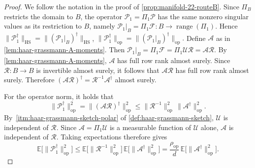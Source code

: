\documentclass[final,onefignum,onetabnum]{siamart250211}
\begin{document}
\begin{proof}
  We follow the notation in the proof of \cref{prop:manifold-22-routeB}.
  Since $\Pi_B$ restricts the domain to $B$, the operator $\mathcal P_1=\Pi_1\mathcal P$ has the same nonzero singular values as its restriction to $B$, namely
  $
  \mathcal P_1\vert_B=\Pi_1\mathcal F:B\to \operatorname{range}(\Pi_1).
  $
  Hence
  $
  \|\mathcal P_1^{\dagger}\|_{\mathrm{HS}}
  =
  \|(\mathcal P_1\vert_B)^{\dagger}\|_{\mathrm{HS}}
  $, $
  \|\mathcal P_1^{\dagger}\|_{\mathrm{op}}
  =
  \|(\mathcal P_1\vert_B)^{\dagger}\|_{\mathrm{op}}.
  $
 Define
  $
  \mathcal A
  $ as in \cref{lem:haar-grassmann-A-moments}.
  Then
  $
  \mathcal P_1\vert_B
  =
  \Pi_1\mathcal F
  =
  \Pi_1\mathcal U\mathcal R
  =
  \mathcal A\mathcal R.
  $
  By \cref{lem:haar-grassmann-A-moments}, $\mathcal A$ has full row rank almost surely.
  Since $\mathcal R:B\to B$ is invertible almost surely, it follows that $\mathcal A\mathcal R$ has full row rank almost surely.
  Therefore
  $
  (\mathcal A\mathcal R)^{\dagger}
  =
  \mathcal R^{-1}\mathcal A^{\dagger}
 $
 almost surely.
  

  For the operator norm, it holds that
  \[
  \|\mathcal P_1^{\dagger}\|_{\mathrm{op}}^{2}
  =
  \|(\mathcal A\mathcal R)^{\dagger}\|_{\mathrm{op}}^{2}
  \le
  \|\mathcal R^{-1}\|_{\mathrm{op}}^{2}\,\|\mathcal A^{\dagger}\|_{\mathrm{op}}^{2}.
  \]
  By~\ref{itm:haar-grassmann-sketch-polar} of \cref{def:haar-grassmann-sketch}, $\mathcal U$ is independent of $\mathcal R$.
  Since $\mathcal A=\Pi_1\mathcal U$ is a measurable function of $\mathcal U$ alone, $\mathcal A$ is independent of $\mathcal R$.
  Taking expectations therefore gives
  \begin{equation}
    \label{eq:haar-op-separate-new}
    \mathbb E\big[\|\mathcal P_1^{\dagger}\|_{\mathrm{op}}^{2}\big]
    \le
    \mathbb E\big[\|\mathcal R^{-1}\|_{\mathrm{op}}^{2}\big]\,
    \mathbb E\big[\|\mathcal A^{\dagger}\|_{\mathrm{op}}^{2}\big]
    =
    \frac{\rho_{\mathrm{op}}}{d}\,\mathbb E\big[\|\mathcal A^{\dagger}\|_{\mathrm{op}}^{2}\big].
  \end{equation}


\end{proof}
\end{document}

